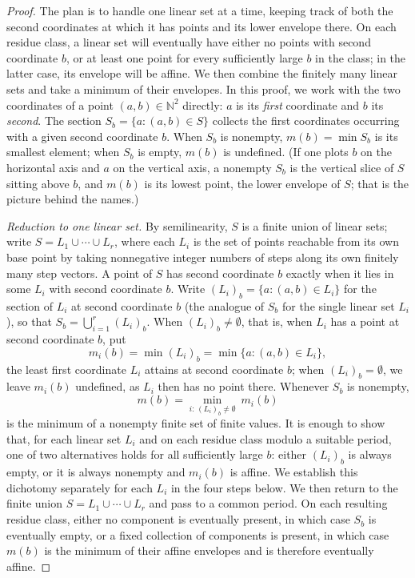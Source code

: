 \documentclass[11pt]{article}
\theoremstyle{definition}
\newcommand{\N}{\mathbb N}
\begin{document}
\begin{proof}
The plan is to handle one linear set at a time, keeping track of both the
second coordinates at which it has points and its lower envelope there.  On
each residue class, a linear set will eventually have either no points with
second coordinate $b$, or at least one point for every sufficiently large $b$
in the class; in the latter case, its envelope will be affine.  We then combine
the finitely many linear sets and take a minimum of their envelopes.
In this proof, we work with the two coordinates of a point $(a,b)\in\N^2$ directly:
$a$ is its \emph{first} coordinate and $b$ its \emph{second}.  The section
$S_b=\{a:(a,b)\in S\}$ collects the first coordinates occurring with a given
second coordinate $b$.  When $S_b$ is nonempty, $m(b)=\min S_b$ is its smallest
element; when $S_b$ is empty, $m(b)$ is undefined.  (If one plots $b$ on the
horizontal axis and $a$ on the vertical axis, a nonempty $S_b$ is the vertical
slice of $S$ sitting above $b$, and $m(b)$ is its lowest point, the lower
envelope of $S$; that is the picture behind the names.)

\vspace{0.5em}
\noindent\emph{Reduction to one linear set.}  By semilinearity, $S$ is a finite
union of linear sets; write $S=L_1\cup\cdots\cup L_r$, where each $L_i$ is the
set of points reachable from its own base point by taking nonnegative integer
numbers of steps along its own finitely many step vectors.  A
point of $S$ has second coordinate $b$ exactly when it lies in some $L_i$ with
second coordinate $b$.  Write $(L_i)_b=\{a:(a,b)\in L_i\}$ for the section of
$L_i$ at second coordinate $b$ (the analogue of $S_b$ for the single linear
set $L_i$), so that $S_b=\bigcup_{i=1}^r (L_i)_b$.  When $(L_i)_b\neq\emptyset$,
that is, when $L_i$ has a point at second coordinate $b$, put
\[
   m_i(b)=\min (L_i)_b=\min\{a:(a,b)\in L_i\},
\]
the least first coordinate $L_i$ attains at second coordinate $b$; when
$(L_i)_b=\emptyset$, we leave $m_i(b)$ undefined, as $L_i$ then has no point
there.  Whenever $S_b$ is nonempty,
\[
   m(b)=\min_{i:\,(L_i)_b\neq\emptyset}\ m_i(b)
\]
is the minimum of a nonempty finite set of finite values.  It is enough to show
that, for each linear set $L_i$ and on each residue class modulo a suitable
period, one of two alternatives holds for all sufficiently large $b$: either
$(L_i)_b$ is always empty, or it is always nonempty and $m_i(b)$ is affine.
We establish this dichotomy separately for each $L_i$ in the four steps below.
We then return to the finite union $S=L_1\cup\cdots\cup L_r$ and pass to a
common period.  On each resulting residue class, either no component is
eventually present, in which case $S_b$ is eventually empty, or a fixed
collection of components is present, in which case $m(b)$ is the minimum of
their affine envelopes and is therefore eventually affine.


\end{proof}
\end{document}
